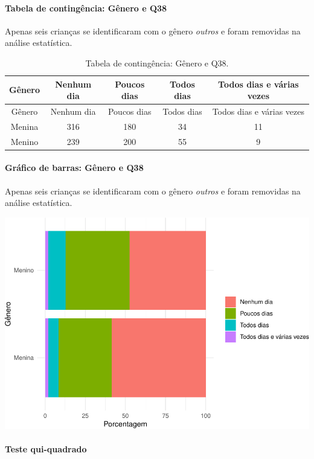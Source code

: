 \documentclass[]{article}
\let\oldparagraph\paragraph
\renewcommand{\paragraph}[1]{\oldparagraph{#1}\mbox{}}
\begin{document}
\cleardoublepage

\hypertarget{tabela-de-continguxeancia-guxeanero-e-q38}{%
\paragraph{Tabela de contingência: Gênero e Q38}\label{tabela-de-continguxeancia-guxeanero-e-q38}}

Apenas seis crianças se identificaram com o gênero \emph{outros} e foram removidas na análise estatística.

\begin{longtable}[]{@{}ccccc@{}}
\caption{\label{tab:unnamed-chunk-1438}Tabela de contingência: Gênero e Q38.}\tabularnewline
\toprule
Gênero & Nenhum dia & Poucos dias & Todos dias & Todos dias e várias vezes\tabularnewline
\midrule
\endfirsthead
\toprule
Gênero & Nenhum dia & Poucos dias & Todos dias & Todos dias e várias vezes\tabularnewline
\midrule
\endhead
Menina & 316 & 180 & 34 & 11\tabularnewline
Menino & 239 & 200 & 55 & 9\tabularnewline
\bottomrule
\end{longtable}

\hypertarget{gruxe1fico-de-barras-guxeanero-e-q38}{%
\paragraph{Gráfico de barras: Gênero e Q38}\label{gruxe1fico-de-barras-guxeanero-e-q38}}

Apenas seis crianças se identificaram com o gênero \emph{outros} e foram removidas na análise estatística.

\begin{center}\includegraphics[width=0.75\linewidth]{relatorio_covid19_files/figure-latex/unnamed-chunk-1439-1} \end{center}

\hypertarget{teste-qui-quadrado-123}{%
\paragraph{Teste qui-quadrado}\label{teste-qui-quadrado-123}}
\end{document}
